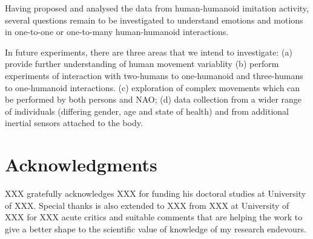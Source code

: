 \documentclass{sigchi}
\begin{document}



Having proposed and analysed the data from human-humanoid imitation activity,
several questions remain to be investigated to understand emotions and motions
 in one-to-one or one-to-many human-humanoid interactions.

In future experiments, there are three areas that we intend to investigate:
(a) provide further understanding of human movement variablity
(b) perform experiments of interaction with two-humans to one-humanoid and
 three-humans to one-humanoid interactions.
(c) exploration of complex movements which can be performed by both persons and NAO;
(d) data collection from a wider range of individuals (differing gender, age and state of health)
 and from additional inertial sensors attached to the body.






\section{Acknowledgments}

XXX gratefully acknowledges XXX for funding his doctoral studies at
University of XXX. Special thanks is also extended to XXX from XXX at
University of XXX for XXX
acute critics and suitable comments that are helping the work to give a better
shape to the scientific value of knowledge of my research endevours.


%
%
%
%
%


\balance{}



\end{document}

